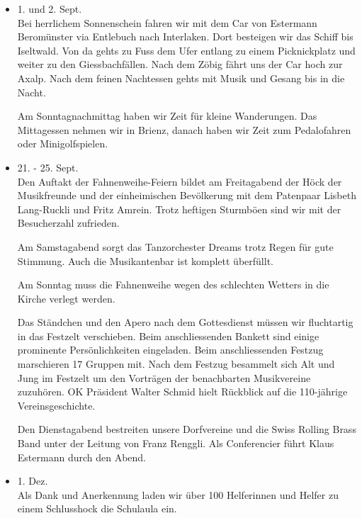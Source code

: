 \begin{history}
\begin{itemize}
        \item 1. und 2. Sept.\\
              Bei herrlichem Sonnenschein fahren wir mit dem Car von Estermann
              Beromünster via Entlebuch nach Interlaken. Dort besteigen wir das Schiff
              bis Iseltwald. Von da gehts zu Fuss dem Ufer entlang zu einem
              Picknickplatz und weiter zu den Giessbachfällen. Nach dem Zöbig fährt
              uns der Car hoch zur Axalp. Nach dem feinen Nachtessen gehts mit Musik
              und Gesang bis in die Nacht.

              Am Sonntagnachmittag haben wir Zeit für kleine Wanderungen. Das
              Mittagessen nehmen wir in Brienz, danach haben wir Zeit zum Pedalofahren
              oder Minigolfspielen.

        \item 21. - 25. Sept.\\
              Den Auftakt der Fahnenweihe-Feiern bildet am Freitagabend der Höck der
              Musikfreunde und der einheimischen Bevölkerung mit dem Patenpaar Lisbeth
              Lang-Ruckli und Fritz Amrein. Trotz heftigen Sturmböen sind wir mit der
              Besucherzahl zufrieden.

              Am Samstagabend sorgt das Tanzorchester Dreams trotz Regen für gute
              Stimmung. Auch die Musikantenbar ist komplett überfüllt.

              Am Sonntag muss die Fahnenweihe wegen des schlechten Wetters in die
              Kirche verlegt werden.

              Das Ständchen und den Apero nach dem Gottesdienst
              müssen wir fluchtartig in das Festzelt verschieben. Beim anschliessenden
              Bankett sind einige prominente Persönlichkeiten eingeladen. Beim
              anschliessenden Festzug marschieren 17 Gruppen mit. Nach dem Festzug
              besammelt sich Alt und Jung im Festzelt um den Vorträgen der
              benachbarten Musikvereine zuzuhören. OK Präsident Walter Schmid hielt
              Rückblick auf die 110-jährige Vereinsgeschichte.

              Den Dienstagabend bestreiten unsere Dorfvereine und die Swiss Rolling
              Brass Band unter der Leitung von Franz Renggli. Als Conferencier führt
              Klaus Estermann durch den Abend.

        \item 1. Dez.\\
              Als Dank und Anerkennung laden wir über 100 Helferinnen und Helfer zu
              einem Schlusshock die Schulaula ein.

    \end{itemize}

\end{history}
